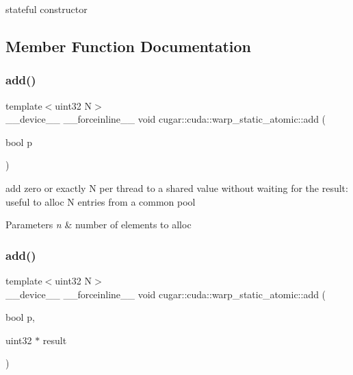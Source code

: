 stateful constructor 

\subsection{Member Function Documentation}
\mbox{\label{structcugar_1_1cuda_1_1warp__static__atomic_a513882c6d2adc46e4f5f3c71ba48b8b8}} 
\subsubsection{\texorpdfstring{add()}{add()}\hspace{0.1cm}{\footnotesize\ttfamily [1/2]}}
{\footnotesize\ttfamily template$<$uint32 N$>$ \\
\+\_\+\+\_\+device\+\_\+\+\_\+ \+\_\+\+\_\+forceinline\+\_\+\+\_\+ void cugar\+::cuda\+::warp\+\_\+static\+\_\+atomic\+::add (\begin{DoxyParamCaption}\item[{bool}]{p }\end{DoxyParamCaption})\hspace{0.3cm}{\ttfamily [inline]}}

add zero or exactly N per thread to a shared value without waiting for the result\+: useful to alloc N entries from a common pool


\begin{DoxyParams}{Parameters}
{\em n} & number of elements to alloc \\
\hline
\end{DoxyParams}
\mbox{\label{structcugar_1_1cuda_1_1warp__static__atomic_a8acc0f476745c3457b52d22fa684432f}} 
\subsubsection{\texorpdfstring{add()}{add()}\hspace{0.1cm}{\footnotesize\ttfamily [2/2]}}
{\footnotesize\ttfamily template$<$uint32 N$>$ \\
\+\_\+\+\_\+device\+\_\+\+\_\+ \+\_\+\+\_\+forceinline\+\_\+\+\_\+ void cugar\+::cuda\+::warp\+\_\+static\+\_\+atomic\+::add (\begin{DoxyParamCaption}\item[{bool}]{p,  }\item[{uint32 $\ast$}]{result }\end{DoxyParamCaption})\hspace{0.3cm}{\ttfamily [inline]}}

